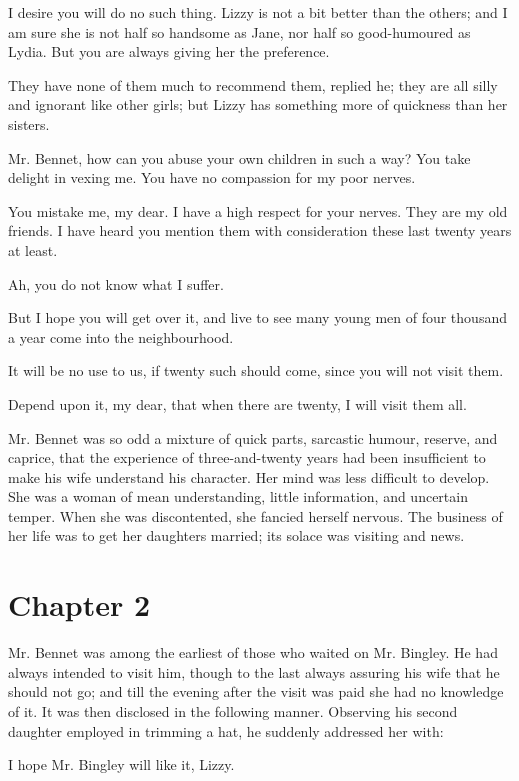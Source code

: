 \documentclass[twocolumn]{article}
\begin{document}
I desire you will do no such thing. Lizzy is not a bit better than the
others; and I am sure she is not half so handsome as Jane, nor half so
good-humoured as Lydia. But you are always giving her the preference.

They have none of them much to recommend them, replied he; they are
all silly and ignorant like other girls; but Lizzy has something more of
quickness than her sisters.

Mr. Bennet, how can you abuse your own children in such a way? You
take delight in vexing me. You have no compassion for my poor nerves.

You mistake me, my dear. I have a high respect for your nerves. They
are my old friends. I have heard you mention them with consideration
these last twenty years at least.

Ah, you do not know what I suffer.

But I hope you will get over it, and live to see many young men of four
thousand a year come into the neighbourhood.

It will be no use to us, if twenty such should come, since you will not
visit them.

Depend upon it, my dear, that when there are twenty, I will visit them
all.

Mr. Bennet was so odd a mixture of quick parts, sarcastic humour,
reserve, and caprice, that the experience of three-and-twenty years had
been insufficient to make his wife understand his character. Her mind
was less difficult to develop. She was a woman of mean understanding,
little information, and uncertain temper. When she was discontented,
she fancied herself nervous. The business of her life was to get her
daughters married; its solace was visiting and news.



\section{Chapter 2}


Mr. Bennet was among the earliest of those who waited on Mr. Bingley. He
had always intended to visit him, though to the last always assuring
his wife that he should not go; and till the evening after the visit was
paid she had no knowledge of it. It was then disclosed in the following
manner. Observing his second daughter employed in trimming a hat, he
suddenly addressed her with:

I hope Mr. Bingley will like it, Lizzy.
\end{document}
